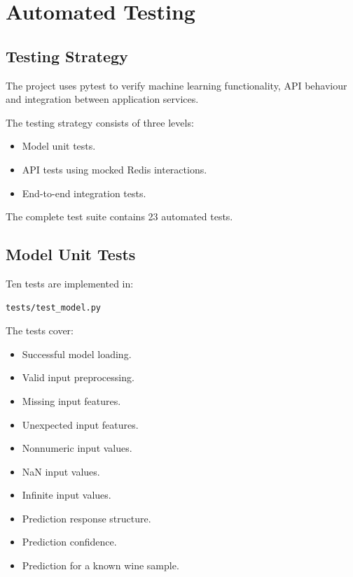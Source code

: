 \documentclass[11pt,a4paper]{article}
\begin{document}
\section{Automated Testing}

\subsection{Testing Strategy}

The project uses pytest \cite{pytest} to verify
machine learning functionality, API behaviour and
integration between application services.

The testing strategy consists of three levels:

\begin{itemize}
    \item Model unit tests.
    \item API tests using mocked Redis interactions.
    \item End-to-end integration tests.
\end{itemize}

The complete test suite contains 23 automated tests.

\subsection{Model Unit Tests}

Ten tests are implemented in:

\begin{lstlisting}
tests/test_model.py
\end{lstlisting}

The tests cover:

\begin{itemize}
    \item Successful model loading.
    \item Valid input preprocessing.
    \item Missing input features.
    \item Unexpected input features.
    \item Nonnumeric input values.
    \item NaN input values.
    \item Infinite input values.
    \item Prediction response structure.
    \item Prediction confidence.
    \item Prediction for a known wine sample.
\end{itemize}
\end{document}
